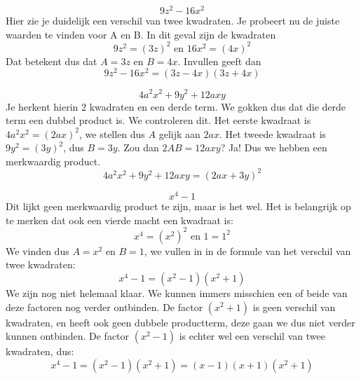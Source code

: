 \begin{voorbeeld}
	\begin{equation*}
	9z^2-16x^2
	\end{equation*}
	Hier zie je duidelijk een verschil van twee kwadraten. Je probeert nu de juiste waarden te vinden voor A en B. In dit geval zijn de kwadraten
	\begin{equation*}
	9z^2=(3z)^2 \text{ en } 16x^2=(4x)^2
	\end{equation*}
Dat betekent dus dat $A=3z$ en $B=4x$. Invullen geeft dan
\begin{equation*}
9z^2-16x^2=(3z-4x)(3z+4x)
\end{equation*}
\end{voorbeeld}
\begin{voorbeeld}
	\begin{equation*}
	4a^2x^2+9y^2+12axy
	\end{equation*}
	Je herkent hierin 2 kwadraten en een derde term. We gokken dus dat die derde term een dubbel product is. We controleren dit. Het eerste kwadraat is $4a^2x^2=(2ax)^2$, we stellen dus $A$ gelijk aan $2ax$. Het tweede kwadraat is $9y^2=(3y)^2$, dus $B=3y$. Zou dan $2AB=12axy$? Ja! Dus we hebben een merkwaardig product.
	\begin{equation*}
	4a^2x^2+9y^2+12axy = (2ax+3y)^2
	\end{equation*}
\end{voorbeeld}
\begin{voorbeeld}
	\begin{equation*}
	x^4-1
	\end{equation*}
	Dit lijkt geen merkwaardig product te zijn, maar is het wel. Het is belangrijk op te merken dat ook een vierde macht een kwadraat is:
	\begin{equation*}
	x^4=(x^2)^2 \text{ en } 1=1^2
	\end{equation*}
We vinden dus $A=x^2$ en $B=1$, we vullen in in de formule van het verschil van twee kwadraten:
\begin{equation*}
x^4-1 = (x^2-1)(x^2+1)
\end{equation*}
We zijn nog niet helemaal klaar. We kunnen immers misschien een of beide van deze factoren nog verder ontbinden. De factor $(x^2+1)$ is geen verschil van kwadraten, en heeft ook geen dubbele productterm, deze gaan we dus niet verder kunnen ontbinden. De factor $(x^2-1)$ is echter wel een verschil van twee kwadraten, dus:
\begin{equation*}
x^4-1 = (x^2-1)(x^2+1) = (x-1)(x+1)(x^2+1)
\end{equation*}
\end{voorbeeld}

